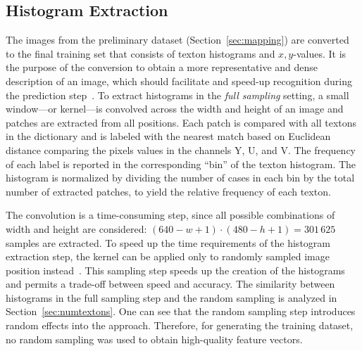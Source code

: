 \documentclass[11pt]{report}
\begin{document}
\subsection{Histogram Extraction}
\label{sec:histogramextract}

The images from the preliminary dataset (Section~\ref{sec:mapping})
are converted to the final training set that consists of texton
histograms and $x,y$-values. It is the purpose of the conversion to
obtain a more representative and dense description of an image, which
should facilitate and speed-up recognition during the prediction
step~\cite{guyon2006introduction}. To extract histograms in the
\emph{full sampling} setting, a small window---or kernel---is
convolved across the width and height of an image and patches are
extracted from all positions. Each patch is compared with all textons
in the dictionary and is labeled with the nearest match based on
Euclidean distance comparing the pixels values in the channels Y, U,
and V. The frequency of each label is reported in the corresponding
``bin'' of the texton histogram. The histogram is normalized by
dividing the number of cases in each bin by the total number of
extracted patches, to yield the relative frequency of each texton.

The convolution is a time-consuming step, since all possible
combinations of width and height are considered:
$(640 - w + 1) \cdot (480 - h + 1) = 301\,625$ samples are
extracted. To speed up the time requirements of the histogram
extraction step, the kernel can be applied only to randomly sampled
image position instead~\cite{de2012sub}. This sampling step speeds up
the creation of the histograms and permits a trade-off between speed
and accuracy. The similarity between histograms in the full sampling
step and the random sampling is analyzed in
Section~\ref{sec:numtextons}. One can see that the random sampling
step introduces random effects into the approach. Therefore, for
generating the training dataset, no random sampling was used to obtain
high-quality feature vectors.

\end{document}
